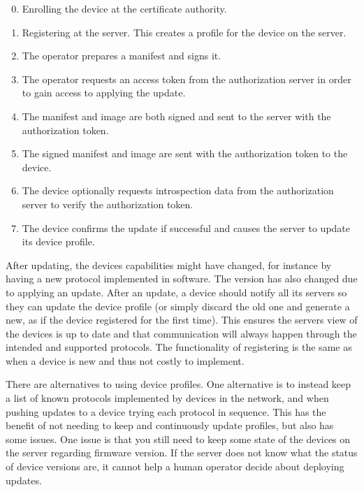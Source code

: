 \documentclass[0-thesis.tex]{subfiles}
\begin{document}
\begin{enumerate}[label=0.\arabic*]
    \setcounter{enumi}{-1}
    \item Enrolling the device at the certificate authority.
    \item Registering at the server. This creates a profile for the device on the server.
    \item The operator prepares a manifest and signs it.
    \item The operator requests an access token from the authorization server in order to
            gain access to applying the update.
    \item The manifest and image are both signed and sent to the server with the
            authorization token.
    \item The signed manifest and image are sent with the authorization token to the
            device.
    \item The device optionally requests introspection data from the authorization server
            to verify the authorization token.
    \item The device confirms the update if successful and causes the server to update
            its device profile.
\end{enumerate}

After updating, the devices capabilities might have changed, for instance by having a new
protocol implemented in software. The version has also changed due to applying an update.
After an update, a device should notify all its servers so they can update the device
profile (or simply discard the old one and generate a new, as if the device registered for
the first time). This ensures the servers view of the devices is up to date and that
communication will always happen through the intended and supported protocols. The
functionality of registering is the same as when a device is new and thus not costly to
implement.

There are alternatives to using device profiles. One alternative is to instead keep a list
of known protocols implemented by devices in the network, and when pushing updates to a
device trying each protocol in sequence. This has the benefit of not needing to keep and
continuously update profiles, but also has some issues. One issue is that you still need
to keep some state of the devices on the server regarding firmware version. If the server
does not know what the status of device versions are, it cannot help a human operator
decide about deploying updates. 
\end{document}
